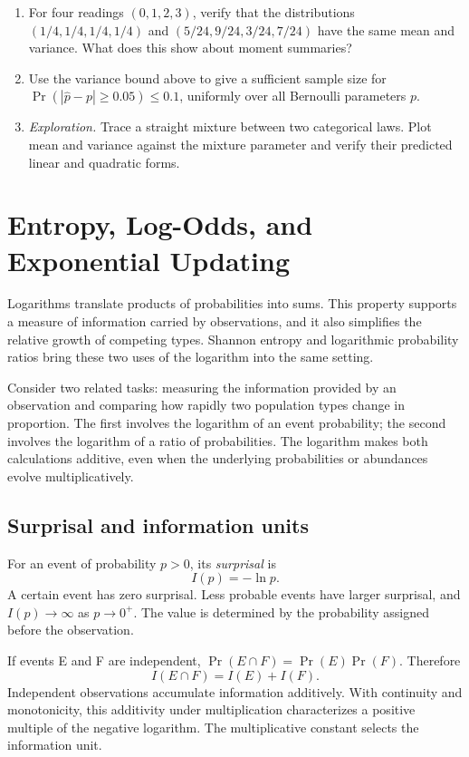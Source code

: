 \documentclass[11pt,oneside,openany]{book}
\theoremstyle{definition}
\theoremstyle{remark}
\newenvironment{exercises}{\begin{enumerate}[label=\thechapter.\arabic*,ref=\thechapter.\arabic*,leftmargin=2.8em,itemsep=6pt]}{\end{enumerate}}
\numberwithin{equation}{chapter}
\begin{document}
\begin{exercises}
\item For four readings $(0,1,2,3)$, verify that the distributions $(1/4,1/4,1/4,1/4)$ and $(5/24,9/24,3/24,7/24)$ have the same mean and variance. What does this show about moment summaries?
\item Use the variance bound above to give a sufficient sample size for $\Pr(|\widehat p-p|\geq0.05)\leq0.1$, uniformly over all Bernoulli parameters $p$.
\item \emph{Exploration.} Trace a straight mixture between two categorical laws. Plot mean and variance against the mixture parameter and verify their predicted linear and quadratic forms.
\end{exercises}

\chapter{Entropy, Log-Odds, and Exponential Updating}
\label{ch:entropy}

Logarithms translate products of probabilities into sums. This property supports a measure of information carried by observations, and it also simplifies the relative growth of competing types. Shannon entropy and logarithmic probability ratios bring these two uses of the logarithm into the same setting.

Consider two related tasks: measuring the information provided by an observation and comparing how rapidly two population types change in proportion. The first involves the logarithm of an event probability; the second involves the logarithm of a ratio of probabilities. The logarithm makes both calculations additive, even when the underlying probabilities or abundances evolve multiplicatively.

\section{Surprisal and information units}
For an event of probability $p>0$, its \emph{surprisal} is
\begin{equation}\label{eq:surprisal}
I(p)=-\ln p.
\end{equation}
A certain event has zero surprisal. Less probable events have larger surprisal, and $I(p)\to\infty$ as $p\to0^+$. The value is determined by the probability assigned before the observation.

If events E and F are independent, $\Pr(E\cap F)=\Pr(E)\Pr(F)$. Therefore
\[
I(E\cap F)=I(E)+I(F).
\]
Independent observations accumulate information additively. With continuity and monotonicity, this additivity under multiplication characterizes a positive multiple of the negative logarithm. The multiplicative constant selects the information unit.
\end{document}
